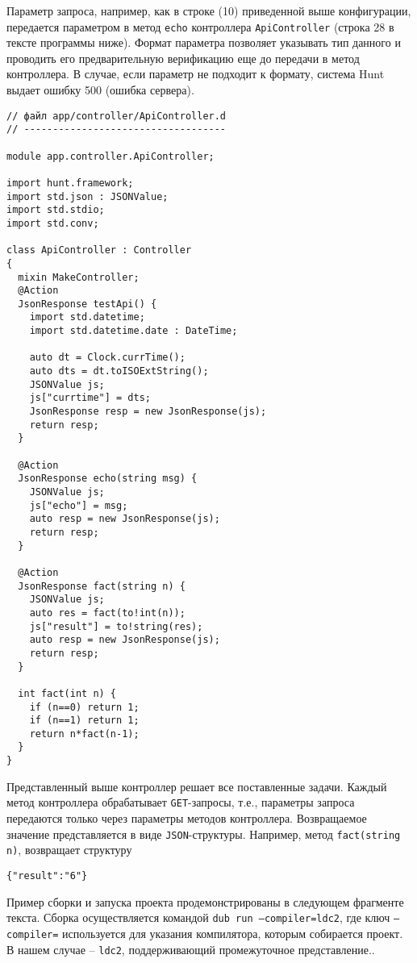 \documentclass[732]{studrep}
\begin{document}
Параметр запроса, например, как в строке (10) приведенной выше конфигурации, передается параметром в метод \verb|echo| контроллера \verb|ApiController| (строка 28 в тексте программы ниже).  Формат параметра позволяет указывать тип данного и проводить его предварительную верификацию еще до передачи в метод контроллера.  В случае, если параметр не подходит к формату, система Hunt выдает ошибку 500 (ошибка сервера).
\begin{verbatim}
// файл app/controller/ApiController.d
// -----------------------------------

module app.controller.ApiController;

import hunt.framework;
import std.json : JSONValue;
import std.stdio;
import std.conv;

class ApiController : Controller
{
  mixin MakeController;
  @Action
  JsonResponse testApi() {
    import std.datetime;
    import std.datetime.date : DateTime;

    auto dt = Clock.currTime();
    auto dts = dt.toISOExtString();
    JSONValue js;
    js["currtime"] = dts;
    JsonResponse resp = new JsonResponse(js);
    return resp;
  }

  @Action
  JsonResponse echo(string msg) {
    JSONValue js;
    js["echo"] = msg;
    auto resp = new JsonResponse(js);
    return resp;
  }

  @Action
  JsonResponse fact(string n) {
    JSONValue js;
    auto res = fact(to!int(n));
    js["result"] = to!string(res);
    auto resp = new JsonResponse(js);
    return resp;
  }

  int fact(int n) {
    if (n==0) return 1;
    if (n==1) return 1;
    return n*fact(n-1);
  }
}
\end{verbatim}

Представленный выше контроллер решает все поставленные задачи.  Каждый метод контроллера обрабатывает \verb|GET|-запросы, т.е., параметры запроса передаются только через параметры методов контроллера.  Возвращаемое значение представляется в виде \verb|JSON|-структуры.  Например, метод \verb|fact(string n)|, возвращает структуру
\begin{verbatim}
{"result":"6"}
\end{verbatim}

Пример сборки и запуска проекта продемонстрированы в следующем фрагменте текста.  Сборка осуществляется командой \texttt{dub run --compiler=ldc2}, где ключ \texttt{--compiler=} используется для указания компилятора, которым собирается проект.  В нашем случае -- \texttt{ldc2}, поддерживающий промежуточное представление..
\end{document}
